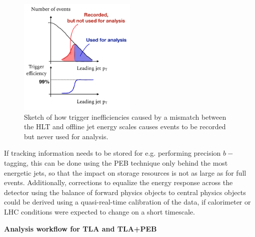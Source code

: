 

\begin{figure} 
\begin{center}
\includegraphics[width=0.5\textwidth]{figures/efficiencySketch}
\caption{\color{black}\label{fig:wastedRate} \small Sketch of how trigger inefficiencies caused by a mismatch between the HLT and offline jet energy scales causes events to be recorded but never used for analysis.} %
\end{center}
\end{figure}


If tracking information needs to be stored for e.g. performing precision $b-$tagging, this can be done using the PEB technique only behind the most energetic jets, so that the impact on storage resources is not as large as for full events. 
Additionally, corrections to equalize the energy response across the detector using the balance of forward physics objects to central physics objects could be derived using a quasi-real-time calibration of the data, if calorimeter or LHC conditions were expected to change on a short timescale. 

\textbf{Analysis workflow for TLA and TLA+PEB}

